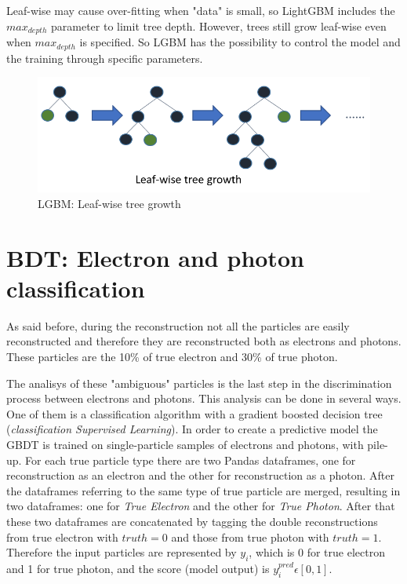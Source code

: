 \documentclass[a4paper, oneside]{book}
\begin{document}
		Leaf-wise may cause over-fitting when "data" is small, so LightGBM includes the $max_{depth}$ parameter to limit tree depth. However, trees still grow leaf-wise even when $max_{depth}$ is specified. So LGBM has the possibility to control the model and the training through specific parameters.
		\begin{figure}[H]
			\centering
			\includegraphics[width=0.35\textheight]{tesi_images/LGBM.png}
			\caption{LGBM: Leaf-wise tree growth}
			\label{fig:LGBM tree}
		\end{figure}
	
	\chapter{BDT: Electron and photon classification}	
		As said before, during the reconstruction not all the particles are easily reconstructed and therefore they are reconstructed both as electrons and photons. These particles are the 10\% of true electron and 30\% of true photon. 
		
		The analisys of these "ambiguous" particles is the last step in the discrimination process between electrons and photons. This analysis can be done in several ways. One of them is a classification algorithm with a gradient boosted decision tree (\textit{classification Supervised Learning}). In order to create a predictive model the GBDT is trained on single-particle samples of electrons and photons, with pile-up. For each true particle type there are two Pandas dataframes, one for reconstruction as an electron and the other for reconstruction as a photon. After the dataframes referring to the same type of true particle are merged, resulting in two dataframes: one for \textit{True Electron} and the other for \textit{True Photon}. After that these two dataframes are concatenated by tagging the double reconstructions from true electron with $truth=0$ and those from true photon with $truth=1$. Therefore the input particles are represented by $y_i$, which is 0 for true electron and 1 for true photon, and the score (model output) is $y_i^{pred} \epsilon [0,1]$.
		
\end{document}
